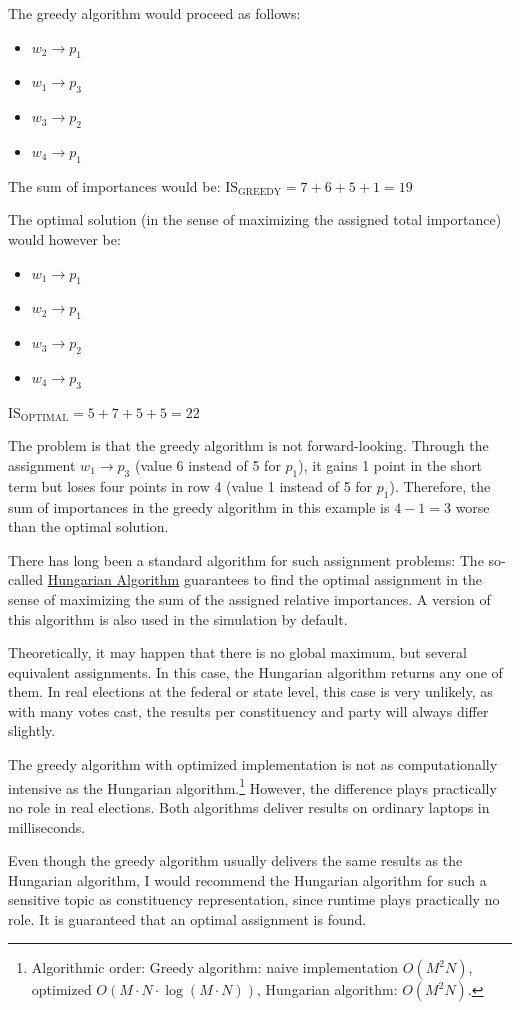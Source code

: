 The greedy algorithm would proceed as follows:
\begin{itemize}[label={}]
  \item $w_2 \longrightarrow p_1$
  \item $w_1 \longrightarrow p_3$
  \item $w_3 \longrightarrow p_2$
  \item $w_4 \longrightarrow p_1$
\end{itemize}

The sum of importances would be: $\mathrm{IS}_{\mathrm{GREEDY}} = 7 + 6 + 5 + 1 = 19$

The optimal solution (in the sense of maximizing the assigned total importance) would however be:
\begin{itemize}[label={}]
  \item $w_1 \longrightarrow p_1$
  \item $w_2 \longrightarrow p_1$
  \item $w_3 \longrightarrow p_2$
  \item $w_4 \longrightarrow p_3$
\end{itemize}

$\mathrm{IS}_{\mathrm{OPTIMAL}} = 5 + 7 + 5 + 5 = 22$

The problem is that the greedy algorithm is not forward-looking. Through the assignment
$w_1 \to p_3$ (value 6 instead of 5 for $p_1$), it gains 1 point in the short term but loses
four points in row 4 (value 1 instead of 5 for $p_1$). Therefore, the sum of importances in the greedy
algorithm in this example is $4 - 1 = 3$ worse than the optimal solution.

There has long been a standard algorithm for such assignment problems: The
so-called \href{https://de.wikipedia.org/wiki/Ungarische\_Methode}{Hungarian Algorithm}
guarantees to find the optimal assignment in the sense of maximizing the sum of the assigned
relative importances. A version of this algorithm is also used in the simulation
by default.

 Theoretically, it may happen that there is no global maximum, but
several equivalent assignments. In this case, the Hungarian algorithm returns any
one of them. In real elections at the federal or state level, this case is very
unlikely, as with many votes cast, the results per constituency and party will
always differ slightly.

The greedy algorithm with optimized implementation is not as computationally intensive as the
Hungarian algorithm.\footnote{Algorithmic order: Greedy algorithm: naive
implementation $O(M^2 N)$, optimized $O(M \cdot N \cdot \log(M \cdot N))$, Hungarian
algorithm: $O(M^2 N)$.} However, the difference plays practically no role in real elections.
Both algorithms deliver results on ordinary laptops in milliseconds.

Even though the greedy algorithm usually delivers the same results as the Hungarian algorithm,
I would recommend the Hungarian algorithm for such a sensitive topic as
constituency representation, since runtime plays practically no role. It is guaranteed that an
optimal assignment is found.
